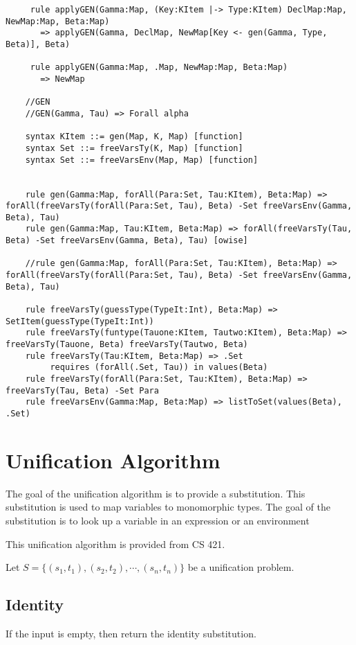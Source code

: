 \begin{lstlisting}
     rule applyGEN(Gamma:Map, (Key:KItem |-> Type:KItem) DeclMap:Map, NewMap:Map, Beta:Map)
       => applyGEN(Gamma, DeclMap, NewMap[Key <- gen(Gamma, Type, Beta)], Beta)

     rule applyGEN(Gamma:Map, .Map, NewMap:Map, Beta:Map)
       => NewMap

    //GEN
    //GEN(Gamma, Tau) => Forall alpha

    syntax KItem ::= gen(Map, K, Map) [function]
    syntax Set ::= freeVarsTy(K, Map) [function]
    syntax Set ::= freeVarsEnv(Map, Map) [function]


    rule gen(Gamma:Map, forAll(Para:Set, Tau:KItem), Beta:Map) => forAll(freeVarsTy(forAll(Para:Set, Tau), Beta) -Set freeVarsEnv(Gamma, Beta), Tau)
    rule gen(Gamma:Map, Tau:KItem, Beta:Map) => forAll(freeVarsTy(Tau, Beta) -Set freeVarsEnv(Gamma, Beta), Tau) [owise]

    //rule gen(Gamma:Map, forAll(Para:Set, Tau:KItem), Beta:Map) => forAll(freeVarsTy(forAll(Para:Set, Tau), Beta) -Set freeVarsEnv(Gamma, Beta), Tau)

    rule freeVarsTy(guessType(TypeIt:Int), Beta:Map) => SetItem(guessType(TypeIt:Int))
    rule freeVarsTy(funtype(Tauone:KItem, Tautwo:KItem), Beta:Map) => freeVarsTy(Tauone, Beta) freeVarsTy(Tautwo, Beta)
    rule freeVarsTy(Tau:KItem, Beta:Map) => .Set
         requires (forAll(.Set, Tau)) in values(Beta)
    rule freeVarsTy(forAll(Para:Set, Tau:KItem), Beta:Map) => freeVarsTy(Tau, Beta) -Set Para
    rule freeVarsEnv(Gamma:Map, Beta:Map) => listToSet(values(Beta), .Set)
\end{lstlisting}
\section{Unification Algorithm}

The goal of the unification algorithm is to provide a substitution. This substitution is used to map variables to monomorphic types. The goal of the substitution is to look up a variable in an expression or an environment 

This unification algorithm is provided from CS 421.

Let $S = \{(s_1 , t_1), (s_2 , t_2), \cdots, (s_n , t_n)\}$ be a
unification problem.

\subsection{Identity}
If the input is empty, then return the identity substitution.

